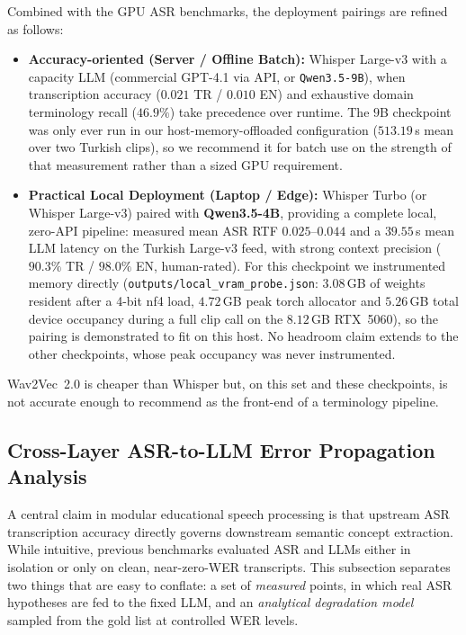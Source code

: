 \documentclass[conference]{IEEEtran}
\begin{document}
Combined with the GPU ASR benchmarks, the deployment pairings are refined as follows:

\begin{itemize}
\item \textbf{Accuracy-oriented (Server / Offline Batch):} Whisper Large-v3 with a capacity LLM (commercial GPT-4.1 via API, or \texttt{Qwen3.5-9B}), when transcription accuracy ($0.021$ TR / $0.010$ EN) and exhaustive domain terminology recall ($46.9\%$) take precedence over runtime. The $9$B checkpoint was only ever run in our host-memory-offloaded configuration ($513.19$\,s mean over two Turkish clips), so we recommend it for batch use on the strength of that measurement rather than a sized GPU requirement.
\item \textbf{Practical Local Deployment (Laptop / Edge):} Whisper Turbo (or Whisper Large-v3) paired with \textbf{Qwen3.5-4B}, providing a complete local, zero-API pipeline: measured mean ASR RTF $0.025$--$0.044$ and a $39.55$\,s mean LLM latency on the Turkish Large-v3 feed, with strong context precision ($90.3\%$ TR / $98.0\%$ EN, human-rated). For this checkpoint we instrumented memory directly (\texttt{outputs/local\_vram\_probe.json}: $3.08$\,GB of weights resident after a 4-bit nf4 load, $4.72$\,GB peak torch allocator and $5.26$\,GB total device occupancy during a full clip call on the $8.12$\,GB RTX~5060), so the pairing is demonstrated to fit on this host. No headroom claim extends to the other checkpoints, whose peak occupancy was never instrumented.
\end{itemize}

Wav2Vec~2.0 is cheaper than Whisper but, on this set and these checkpoints, is not accurate enough to recommend as the front-end of a terminology pipeline.

\subsection{Cross-Layer ASR-to-LLM Error Propagation Analysis}
\label{sec:cross-layer}

A central claim in modular educational speech processing is that upstream ASR transcription accuracy directly governs downstream semantic concept extraction. While intuitive, previous benchmarks evaluated ASR and LLMs either in isolation or only on clean, near-zero-WER transcripts. This subsection separates two things that are easy to conflate: a set of \emph{measured} points, in which real ASR hypotheses are fed to the fixed LLM, and an \emph{analytical degradation model} sampled from the gold list at controlled WER levels.
\end{document}
